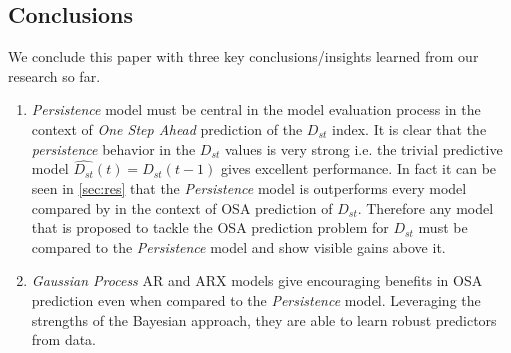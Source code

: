 \documentclass[referee,a4paper,12pt,traditabstract]{swsc}
\begin{document}
\begin{linenumbers}

  
\section{Conclusions}

We conclude this paper with three key conclusions/insights learned from our research so far.
   \begin{enumerate}
      \item \emph{Persistence} model must be central in the model evaluation process in the context of \emph{One Step Ahead} prediction of the $D_{st}$ index. It is clear that the \emph{persistence} behavior in the $D_{st}$ values is very strong i.e. the trivial predictive model $\hat{D_{st}}(t) = D_{st}(t-1)$ gives excellent performance. In fact it can be seen in \ref{sec:res} that the \emph{Persistence} model is outperforms every model compared by \citet{Ji2012} in the context of OSA prediction of $D_{st}$. Therefore any model that is proposed to tackle the OSA prediction problem for $D_{st}$ must be compared to the \emph{Persistence} model and show visible gains above it.
      
      \item \emph{Gaussian Process} AR and ARX models give encouraging benefits in OSA prediction even when compared to the \emph{Persistence} model. Leveraging the strengths of the Bayesian approach, they are able to learn robust predictors from data. 
      

\end{enumerate}
\end{linenumbers}
\end{document}
